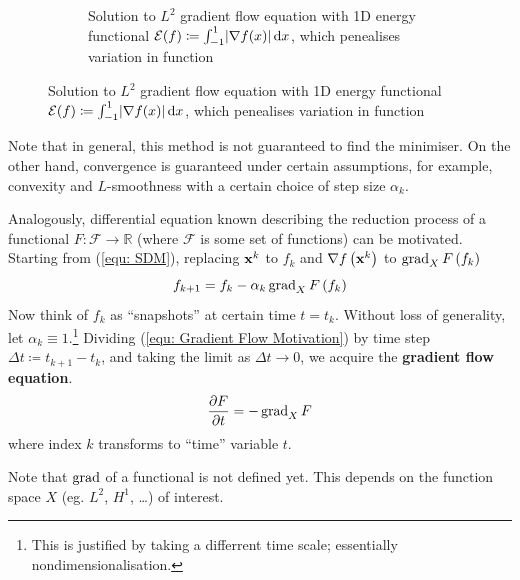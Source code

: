 \documentclass[../dissertation.tex]{subfiles}
\begin{document}
\begin{figure}[tbp]
\begin{subfigure}[b]{0.4\textwidth}
        \caption{Solution to $L^2$ gradient flow equation with 1D energy functional $\mathcal{E} (f) \coloneqq \int_{-1}^1 \lvert\nabla f(x)\lvert \, \text{d} x$, which penealises variation in function}
        \label{fig: GF}
    \end{subfigure}
\end{figure}
Note that in general, this method is not guaranteed to find the minimiser.
On the other hand, convergence is guaranteed under certain assumptions, for example, convexity and $L$-smoothness with a certain choice of step size $\alpha_k$.

Analogously, differential equation known describing the reduction process of a functional $F:\mathcal{F} \rightarrow \mathbb{R}$ (where $\mathcal{F}$ is some set of functions) can be motivated.
Starting from (\ref{equ: SDM}), replacing $\mathbf{x}^{k}$ to $f_k$ and $\nabla f\left( \mathbf{x}^k \right)$ to $\operatorname{grad}_X F\left( f_k \right)$
\begin{equation}
    f_{k+1} = f_k - \alpha_k \operatorname{grad}_X F \left( f_k \right)
    \label{equ: Gradient Flow Motivation}
\end{equation}
Now think of $f_k$ as ``snapshots'' at certain time $t = t_k$.
Without loss of generality, let $\alpha_k \equiv 1$.\footnote{
This is justified by taking a differrent time scale; essentially nondimensionalisation.}
Dividing (\ref{equ: Gradient Flow Motivation}) by time step $\Delta t \coloneqq t_{k+1} - t_k$,
and taking the limit as $\Delta t \rightarrow 0$,
we acquire the \textbf{gradient flow equation}\cite{YSC2021}.
\begin{equation}
    \frac{\partial F}{\partial t} = - \operatorname{grad}_X F
\end{equation}
where index $k$ transforms to ``time'' variable $t$.

Note that $\operatorname{grad}$ of a functional is not defined yet. This depends on the function space $X$ (eg. $L^2$, $H^1$, \ldots) of interest.
\end{document}
